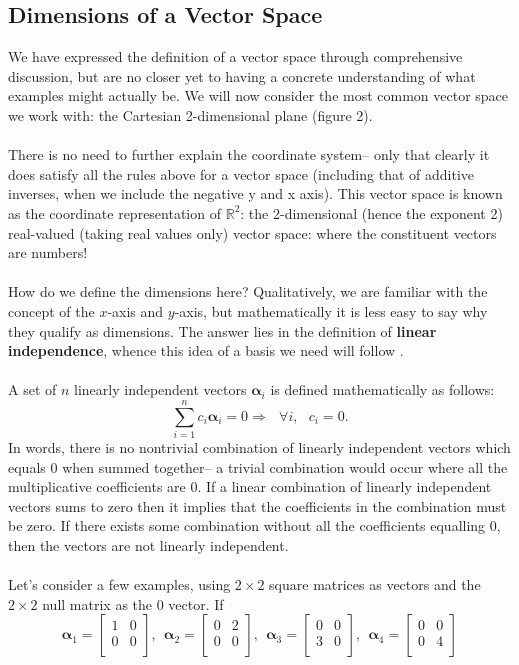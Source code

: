 \subsection{Dimensions of a Vector Space}
We have expressed the definition of a vector space through comprehensive discussion, but are no closer yet to having a concrete understanding of what examples might actually be. We will now consider the most common vector space we work with: the Cartesian 2-dimensional plane (figure 2).
\\\\
There is no need to further explain the coordinate system-- only that clearly it does satisfy all the rules above for a vector space (including that of additive inverses, when we include the negative y and x axis). This vector space is known as the coordinate representation of $\mathbb{R}^2$: the 2-dimensional (hence the exponent 2) real-valued (taking real values only) vector space: where the constituent vectors are numbers!
\\\\
How do we define the dimensions here? Qualitatively, we are familiar with the concept of the $x$-axis and $y$-axis, but mathematically it is less easy to say why they qualify as dimensions. The answer lies in the definition of \textbf{linear independence}, whence this idea of a basis we need will follow .
\\\\
A set of $n$ linearly independent vectors $\bm{\alpha}_{i}$ is defined mathematically as follows:
$$
\sum_{i=1}^{n}c_{i}\bm{\alpha}_{i}=0 \Rightarrow\:\:\: \forall i, \:\:\: c_{i}=0.
$$
In words, there is no nontrivial combination of linearly independent vectors which equals $0$ when summed together-- a trivial combination would occur where all the multiplicative coefficients are $0$. If a linear combination of linearly independent vectors sums to zero then it implies that the coefficients in the combination must be zero. If there exists some combination without all the coefficients equalling $0$, then the vectors are not linearly independent. 
\\\\
Let's consider a few examples, using $2\times2$ square matrices as vectors and the $2\times2$ null matrix as the $0$ vector. If
$$
\bm{\alpha}_{1} = \begin{bmatrix}
    1 & 0 \\
    0 & 0 \\
    \end{bmatrix}, \:\:
\bm{\alpha}_{2} = \begin{bmatrix}
    0 & 2 \\
    0 & 0 \\
    \end{bmatrix}, \:\:
\bm{\alpha}_{3}= \begin{bmatrix}
    0 & 0 \\
    3 & 0 \\
    \end{bmatrix}, \:\:
\bm{\alpha}_{4} = \begin{bmatrix}
    0 & 0 \\
    0 & 4 \\
    \end{bmatrix}
$$
